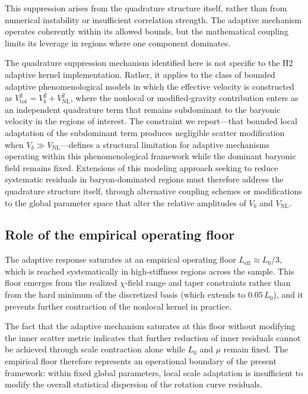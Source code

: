 \documentclass[twocolumn,linenumbers]{aastex701}
\begin{document}
This suppression arises from the quadrature structure itself, rather than
from numerical instability or insufficient correlation strength. The adaptive
mechanism operates coherently within its allowed bounds, but the mathematical
coupling limits its leverage in regions where one component dominates.

The quadrature suppression mechanism identified here is not specific to the
H2 adaptive kernel implementation. Rather, it applies to the class of bounded
adaptive phenomenological models in which the effective velocity is constructed
as $V^2_{\mathrm{tot}} = V^2_b + V^2_{\mathrm{NL}}$, where the nonlocal or
modified-gravity contribution enters as an independent quadrature term that
remains subdominant to the baryonic velocity in the regions of interest.
The constraint we report---that bounded local adaptation of the subdominant
term produces negligible scatter modification when $V_b \gg
V_{\mathrm{NL}}$---defines a structural limitation for adaptive mechanisms
operating within this phenomenological framework while the dominant baryonic
field remains fixed. Extensions of this modeling approach seeking to reduce
systematic residuals in baryon-dominated regions must therefore address the
quadrature structure itself, through alternative coupling schemes or
modifications to the global parameter space that alter the relative amplitudes
of $V_b$ and $V_{\mathrm{NL}}$.

\subsection{Role of the empirical operating floor}

The adaptive response saturates at an empirical operating floor
$L_{\mathrm{eff}} \approx L_0/3$, which is reached systematically in
high-stiffness regions across the sample. This floor emerges from the
realized $\chi$-field range and taper constraints rather than from the
hard minimum of the discretized basis (which extends to $0.05\,L_0$),
and it prevents further contraction of the nonlocal kernel in practice.

The fact that the adaptive mechanism saturates at this floor without
modifying the inner scatter metric indicates that further reduction of
inner residuals cannot be achieved through scale contraction alone while
$L_0$ and $\mu$ remain fixed. The empirical floor therefore represents an
operational boundary of the present framework: within fixed global parameters,
local scale adaptation is insufficient to modify the overall statistical
dispersion of the rotation curve residuals.
\end{document}
